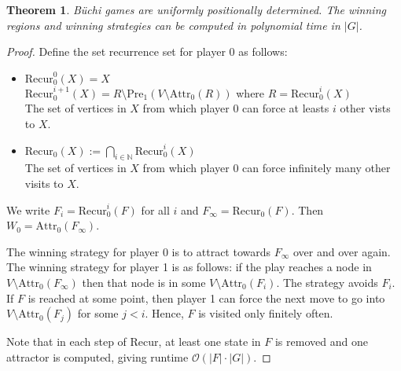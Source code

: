 \documentclass{article}
\newtheorem{theorem}{Theorem}
\begin{document}
\begin{theorem}
	Büchi games are uniformly positionally determined. The winning regions and winning strategies can be computed in polynomial time in $|G|$.
\end{theorem}
\begin{proof}
	Define the set recurrence set for player 0 as follows:
	\begin{itemize}
		\item $\text{Recur}^0_0(X) = X$ \\
			$\text{Recur}^{i+1}_0(X) = R \setminus \text{Pre}_1(V \setminus \text{Attr}_0(R))$ where $R = \text{Recur}^i_0(X)$ \\
			The set of vertices in $X$ from which player 0 can force at leasts $i$ other vists to $X$.
		\item $\text{Recur}_0(X) := \bigcap_{i \in \mathbb{N}} \text{Recur}^i_0(X)$ \\
			The set of vertices in $X$ from which player 0 can force infinitely many other visits to $X$.
	\end{itemize}
	
	We write $F_i = \text{Recur}^i_0(F)$ for all $i$ and $F_\infty = \text{Recur}_0(F)$. Then $W_0 = \text{Attr}_0(F_\infty)$.
	
	 The winning strategy for player 0 is to attract towards $F_\infty$ over and over again. The winning strategy for player 1 is as follows: if the play reaches a node in $V \setminus \text{Attr}_0(F_\infty)$ then that node is in some $V \setminus \text{Attr}_0(F_i)$. The strategy avoids $F_i$. If $F$ is reached at some point, then player 1 can force the next move to go into $V \setminus \text{Attr}_0(F_j)$ for some $j < i$. Hence, $F$ is visited only finitely often.
	
	Note that in each step of $\text{Recur}$, at least one state in $F$ is removed and one attractor is computed, giving runtime $\mathcal{O}(|F| \cdot |G|)$.
\end{proof}
\end{document}
